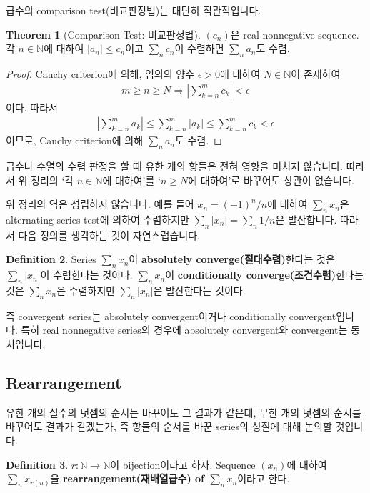 \documentclass[12pt]{article}
\theoremstyle{definition}
\newtheorem{thm}{Theorem}[section]
\newtheorem{defn}[thm]{Definition}
\def\NN{\mathbb{N}}
\def\eps{\epsilon}
\newcommand{\abs}[1]{\left\vert#1\right\vert}
\begin{document}
급수의 comparison test(비교판정법)는 대단히 직관적입니다.


	\begin{thm}[Comparison Test: 비교판정법]
		\((c_n)\)은 real nonnegative sequence. 각 \(n \in \NN\)에 대하여 \(\abs{a_n} \le c_n\)이고 \(\sum _n c_n\)이 수렴하면 \(\sum _n a_n\)도 수렴.
	\end{thm}
	\begin{proof}
		Cauchy criterion에 의해, 임의의 양수 \(\eps > 0\)에 대하여 \(N \in \NN\)이 존재하여
		\begin{align*}
			m \ge n \ge N \Rightarrow \abs{\sum_{k=n}^m c_k} < \eps
		\end{align*}
		이다. 따라서
		\begin{align*}
			\abs{\sum_{k=n}^m a_k} \le  \sum_{k=n}^m \abs{a_k} \le \sum_{k=n}^m c_k < \eps
		\end{align*}
		이므로, Cauchy criterion에 의해 \(\sum _n a_n\)도 수렴.
	\end{proof}

급수나 수열의 수렴 판정을 할 때 유한 개의 항들은 전혀 영향을 미치지 않습니다. 따라서 위 정리의 `각 \(n \in \NN\)에 대하여'를 `\(n \ge N\)에 대하여'로 바꾸어도 상관이 없습니다.

위 정리의 역은 성립하지 않습니다. 예를 들어 \(x_n = (-1)^n / n\)에 대하여 \(\sum_n x_n\)은 alternating series test에 의하여 수렴하지만 \(\sum_n \abs{x_n} = \sum_n 1/n\)은 발산합니다. 따라서 다음 정의를 생각하는 것이 자연스럽습니다.

	\begin{defn}
		Series \(\sum_n x_n\)이 \textbf{absolutely converge(절대수렴)}한다는 것은 \(\sum_n \abs{x_n}\)이 수렴한다는 것이다. \(\sum_n x_n\)이 \textbf{conditionally converge(조건수렴)}한다는 것은 \(\sum_n x_n\)은 수렴하지만 \(\sum_n \abs{x_n}\)은 발산한다는 것이다.
	\end{defn}

즉 convergent series는 absolutely convergent이거나 conditionally convergent입니다. 특히 real nonnegative series의 경우에 absolutely convergent와 convergent는 동치입니다.

\subsection{Rearrangement}

유한 개의 실수의 덧셈의 순서는 바꾸어도 그 결과가 같은데, 무한 개의 덧셈의 순서를 바꾸어도 결과가 같겠는가, 즉 항들의 순서를 바꾼 series의 성질에 대해 논의할 것입니다.

	\begin{defn}
		\(r: \NN \rightarrow \NN\)이 bijection이라고 하자. Sequence \((x_n)\)에 대하여 \(\sum_n x_{r(n)}\)을 \textbf{rearrangement(재배열급수) of \(\sum_n x_n\)}이라고 한다.
	\end{defn}
\end{document}
